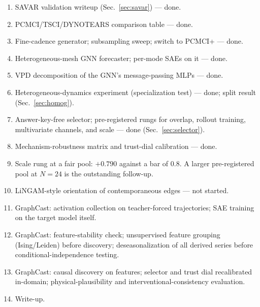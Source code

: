 \begin{enumerate}[nosep]
  \item SAVAR validation writeup (Sec.~\ref{sec:savar}) --- done.
  \item PCMCI/TSCI/DYNOTEARS comparison table --- done.
  \item Fine-cadence generator; subsampling sweep; switch to PCMCI+ --- done.
  \item Heterogeneous-mesh GNN forecaster; per-mode SAEs on it --- done.
  \item VPD decomposition of the GNN's message-passing MLPs --- done.
  \item Heterogeneous-dynamics experiment (specialization test) --- done; split
        result (Sec.~\ref{sec:homog}).
  \item Answer-key-free selector; pre-registered rungs for overlap, rollout
        training, multivariate channels, and scale --- done
        (Sec.~\ref{sec:selector}).
  \item Mechanism-robustness matrix and trust-dial calibration --- done.
  \item Scale rung at a fair pool: $+0.790$ against a bar of $0.8$. A larger
        pre-registered pool at $N=24$ is the outstanding follow-up.
  \item LiNGAM-style orientation of contemporaneous edges --- not started.
  \item GraphCast: activation collection on teacher-forced trajectories; SAE
        training on the target model itself.
  \item GraphCast: feature-stability check; unsupervised feature grouping
        (Ising/Leiden) before discovery; deseasonalization of all derived series
        before conditional-independence testing.
  \item GraphCast: causal discovery on features; selector and trust dial
        recalibrated in-domain; physical-plausibility and
        interventional-consistency evaluation.
  \item Write-up.
\end{enumerate}
